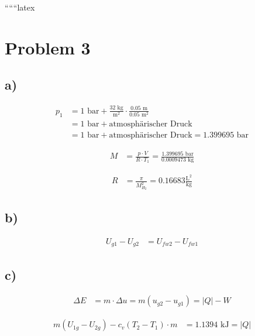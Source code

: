 
``````latex


\section*{Problem 3}

\subsection*{a)}

\begin{align*}
p_1 &= 1 \text{ bar} + \frac{32 \text{ kg}}{\text{m}^2} \cdot \frac{0.05 \text{ m}}{0.05 \text{ m}^2} \\
&= 1 \text{ bar} + \text{atmosphärischer Druck} \\
&= 1 \text{ bar} + \text{atmosphärischer Druck} = 1.399695 \text{ bar}
\end{align*}

\begin{align*}
M &= \frac{p \cdot V}{R \cdot T_1} = \frac{1.399695 \text{ bar}}{0.0009473 \text{ kg}}
\end{align*}

\begin{align*}
R &= \frac{\pi}{M_{H_2}^2} = 0.16683 \frac{\text{L}^2}{\text{kg}}
\end{align*}

\subsection*{b)}

\begin{align*}
U_{g1} - U_{g2} &= U_{fw2} - U_{fw1}
\end{align*}


\subsection*{c)}

\begin{align*}
\Delta E &= m \cdot \Delta u = m (u_{g2} - u_{g1}) = |Q| - W
\end{align*}

\begin{align*}
m (U_{1g} - U_{2g}) - c_v (T_2 - T_1) \cdot m &= 1.1394 \text{ kJ} = |Q|
\end{align*}

